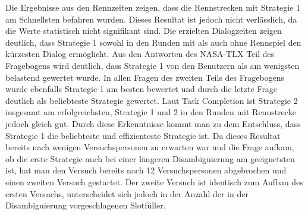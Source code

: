 \documentclass[12pt,a4paper]{scrartcl}
\begin{document}
Die Ergebnisse aus den Rennzeiten zeigen, dass die Rennstrecken mit Strategie 1 am Schnellsten befahren wurden. Dieses Resultat ist jedoch nicht verlässlich, da die Werte statistisch nicht signifikant sind.
Die erzielten Dialogzeiten zeigen deutlich, dass Strategie 1 sowohl in den Runden mit als auch ohne Rennspiel den kürzesten Dialog ermöglicht. Aus den Antworten des NASA-TLX Teil des Fragebogens wird deutlich, dass Strategie 1 von den Benutzern als am wenigsten belastend gewertet wurde.  In allen Fragen des zweiten Teils des Fragebogens wurde ebenfalls Strategie 1 am besten bewertet und durch die letzte Frage deutlich als beliebteste Strategie gewertet. Laut Task Completion ist Strategie 2 insgesamt am erfolgreichsten, Strategie 1 und 2 in den Runden mit Rennstrecke jedoch gleich gut.
Durch diese Erkenntnisse kommt man zu dem Entschluss, dass Strategie 1 die beliebteste und effizienteste Strategie ist. \newline \newline
Da dieses Resultat bereits nach wenigen Versuchspersonen zu erwarten war und die Frage aufkam, ob die erste Strategie auch bei einer längeren Disambiguierung am geeignetsten ist, hat man den Versuch bereits nach 12 Versuchspersonen abgebrochen und einen zweiten Versuch gestartet. Der zweite Versuch ist identisch zum Aufbau des ersten Versuchs, unterscheidet sich jedoch in der Anzahl der in der Disambiguierung vorgeschlagenen Slotfüller. 
\end{document}
